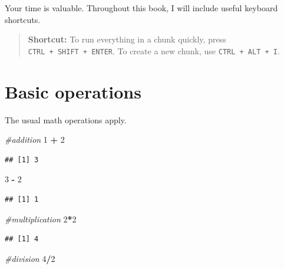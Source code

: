 \documentclass[]{book}
\newenvironment{Shaded}{\begin{snugshade}}{\end{snugshade}}
\newcommand{\CommentTok}[1]{\textcolor[rgb]{0.56,0.35,0.01}{\textit{#1}}}
\newcommand{\DecValTok}[1]{\textcolor[rgb]{0.00,0.00,0.81}{#1}}
\newcommand{\OperatorTok}[1]{\textcolor[rgb]{0.81,0.36,0.00}{\textbf{#1}}}
\newcommand{\StringTok}[1]{\textcolor[rgb]{0.31,0.60,0.02}{#1}}
\begin{document}
Your time is valuable. Throughout this book, I will include useful keyboard shortcuts.

\begin{quote}
\textbf{Shortcut:} To run everything in a chunk quickly, press \texttt{CTRL\ +\ SHIFT\ +\ ENTER}. To create a new chunk, use \texttt{CTRL\ +\ ALT\ +\ I}.
\end{quote}

\hypertarget{basic-operations}{%
\section{Basic operations}\label{basic-operations}}

The usual math operations apply.

\begin{Shaded}
\begin{Highlighting}[]
\CommentTok{#addition}
\DecValTok{1} \OperatorTok{+}\StringTok{ }\DecValTok{2} 
\end{Highlighting}
\end{Shaded}

\begin{verbatim}
## [1] 3
\end{verbatim}

\begin{Shaded}
\begin{Highlighting}[]
\DecValTok{3} \OperatorTok{-}\StringTok{ }\DecValTok{2}
\end{Highlighting}
\end{Shaded}

\begin{verbatim}
## [1] 1
\end{verbatim}

\begin{Shaded}
\begin{Highlighting}[]
\CommentTok{#multiplication}
\DecValTok{2}\OperatorTok{*}\DecValTok{2}
\end{Highlighting}
\end{Shaded}

\begin{verbatim}
## [1] 4
\end{verbatim}

\begin{Shaded}
\begin{Highlighting}[]
\CommentTok{#division}
\DecValTok{4}\OperatorTok{/}\DecValTok{2}
\end{Highlighting}
\end{Shaded}
\end{document}
